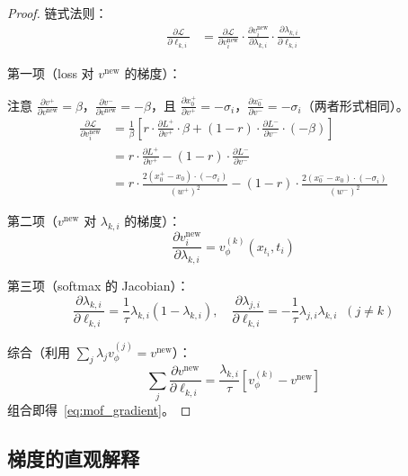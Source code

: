 \documentclass[11pt,a4paper]{article}
\newcommand{\loss}{\mathcal{L}}
\newcommand{\vphi}{v_\phi}
\theoremstyle{definition}
\begin{document}
\begin{proof}
链式法则：
\begin{align}
\frac{\partial \loss}{\partial \ell_{k,i}}
&= \frac{\partial \loss}{\partial v^{\mathrm{new}}_i} \cdot \frac{\partial v^{\mathrm{new}}_i}{\partial \lambda_{k,i}} \cdot \frac{\partial \lambda_{k,i}}{\partial \ell_{k,i}}
\end{align}

第一项（loss 对 $v^{\mathrm{new}}$ 的梯度）：

注意 $\frac{\partial v^+}{\partial v^{\mathrm{new}}} = \beta$，$\frac{\partial v^-}{\partial v^{\mathrm{new}}} = -\beta$，且 $\frac{\partial x_0^+}{\partial v^+} = -\sigma_i$，$\frac{\partial x_0^-}{\partial v^-} = -\sigma_i$（两者形式相同）。
\begin{align}
\frac{\partial \loss}{\partial v^{\mathrm{new}}_i} &= \frac{1}{\beta}\left[r \cdot \frac{\partial L^+}{\partial v^+}\cdot \beta + (1-r)\cdot \frac{\partial L^-}{\partial v^-}\cdot (-\beta)\right] \\
&= r \cdot \frac{\partial L^+}{\partial v^+} - (1-r)\cdot \frac{\partial L^-}{\partial v^-} \\
&= r \cdot \frac{2(x_0^+ - x_0) \cdot (-\sigma_i)}{(w^+)^2} - (1-r)\cdot \frac{2(x_0^- - x_0)\cdot(-\sigma_i)}{(w^-)^2}
\end{align}

第二项（$v^{\mathrm{new}}$ 对 $\lambda_{k,i}$ 的梯度）：
\begin{equation}
\frac{\partial v^{\mathrm{new}}_i}{\partial \lambda_{k,i}} = \vphi^{(k)}(x_{t_i}, t_i)
\end{equation}

第三项（softmax 的 Jacobian）：
\begin{equation}
\frac{\partial \lambda_{k,i}}{\partial \ell_{k,i}} = \frac{1}{\tau}\lambda_{k,i}(1 - \lambda_{k,i}), \quad
\frac{\partial \lambda_{j,i}}{\partial \ell_{k,i}} = -\frac{1}{\tau}\lambda_{j,i}\lambda_{k,i} \;\;(j \neq k)
\end{equation}

综合（利用 $\sum_j \lambda_j \vphi^{(j)} = v^{\mathrm{new}}$）：
\begin{equation}
\sum_j \frac{\partial v^{\mathrm{new}}}{\partial \ell_{k,i}} = \frac{\lambda_{k,i}}{\tau}\left[\vphi^{(k)} - v^{\mathrm{new}}\right]
\end{equation}
组合即得~\eqref{eq:mof_gradient}。
\end{proof}

\subsection{梯度的直观解释}
\end{document}

